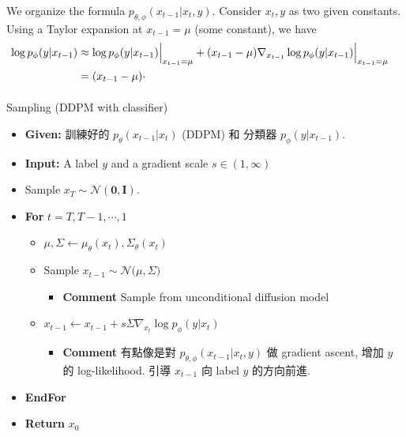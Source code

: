 \documentclass[
]{article}
\makeatletter
\let\oldparagraph\paragraph
\renewcommand{\paragraph}{
    \@ifstar
      \xxxParagraphStar
      \xxxParagraphNoStar
  }
\newcommand{\xxxParagraphStar}[1]{\oldparagraph*{#1}\mbox{}}
\newcommand{\xxxParagraphNoStar}[1]{\oldparagraph{#1}\mbox{}}
\providecommand{\tightlist}{%
  \setlength{\itemsep}{0pt}\setlength{\parskip}{0pt}}\usepackage{longtable,booktabs,array}
\theoremstyle{remark}
\makeatother
\begin{document}
\begin{itemize}
\begin{itemize}
    We organize the formula \(p_{\theta,\phi}(x_{t-1}\vert x_t,y).\)
    Consider \(x_t, y\) as two given constants. Using a Taylor expansion
    at \(x_{t-1}=\mu\) (some constant), we have \[
    \begin{aligned}
      \log p_{\phi}(y\vert x_{t-1}) 
      &\approx  \log p_{\phi}(y\vert x_{t-1})\Big\vert_{x_{t-1}=\mu} + (x_{t-1}-\mu) \nabla_{x_{t-1}} \log p_{\phi}(y\vert x_{t-1})\Big\vert_{x_{t-1}=\mu} \cr
      &= (x_{t-1}-\mu) \cdot 
    \end{aligned}
    \]
  \end{itemize}
\end{itemize}

\paragraph{Sampling (DDPM with
classifier)}\label{sampling-ddpm-with-classifier}

\begin{itemize}
\tightlist
\item
  \textbf{Given:} 訓練好的 \(p_{\theta}(x_{t-1}\vert x_t)\) (DDPM) 和
  分類器 \(p_{\phi}(y\vert x_{t-1}).\)
\item
  \textbf{Input:} A label \(y\) and a gradient scale \(s\in (1,\infty)\)
\item
  Sample \(x_T\sim \mathcal{N}(\mathbf{0},\mathbf{I}).\)
\item
  \textbf{For} \(t=T,T-1,\cdots,1\)

  \begin{itemize}
  \tightlist
  \item
    \(\mu,\Sigma \leftarrow \mu_{\theta}(x_t), \Sigma_{\theta}(x_t)\)
  \item
    Sample \(x_{t-1}\sim \mathcal{N}\bigl( \mu , \Sigma \bigr)\)

    \begin{itemize}
    \tightlist
    \item
      \textbf{Comment} Sample from unconditional diffusion model
    \end{itemize}
  \item
    \(x_{t-1}\leftarrow x_{t-1} + s \Sigma \nabla_{x_t} \log p_{\phi} (y\vert x_t)\)

    \begin{itemize}
    \item
      \textbf{Comment} 有點像是對
      \(p_{\theta,\phi}(x_{t-1}\vert x_t,y)\) 做 gradient ascent, 增加
      \(y\) 的 log-likelihood. 引導 \(x_{t-1}\) 向 label \(y\)
      的方向前進.
    \end{itemize}
  \end{itemize}
\item
  \textbf{EndFor}
\item
  \textbf{Return} \(x_0\)
\end{itemize}
\end{document}
